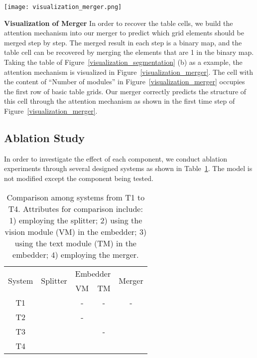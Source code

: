 \documentclass[review]{elsarticle}
\begin{document}
\begin{figure*}[!htb]
	\centerline{\texttt{[image: visualization\_merger.png]}}
	\caption{The visualization of the attention mechanism in the merger on the table images of the SciTSR dataset. The blue lines are the prediction of table grid structure from the splitter. The green mask in the table image denotes which grid elements should be merged for each time step.}
	\label{visualization_merger}
\end{figure*}

\textbf{Visualization of Merger} In order to recover the table cells, we build the attention mechanism into our merger to predict which grid elements should be merged step by step. The merged result in each step is a binary map, and the table cell can be recovered by merging the elements that are 1 in the binary map. Taking the table of Figure~\ref{visualization_segmentation} (b) as a example, the attention mechanism is visualized in Figure~\ref{visualization_merger}. The cell with the content of “Number of modules” in Figure~\ref{visualization_merger} occupies the first row of basic table grids. Our merger correctly predicts the structure of this cell through the attention mechanism as shown in the first time step of Figure~\ref{visualization_merger}.

\subsection{Ablation Study}
In order to investigate the effect of each component, we conduct ablation experiments through several designed systems as shown in Table~\ref{ablation-systems}. The model is not modified except the component being tested.

\begin{table}[!htp]
	\centering
	\renewcommand\arraystretch{1.1}
	\setlength{\tabcolsep}{4mm}
	
	\caption{Comparison among systems from T1 to T4. Attributes for comparison include: 1) employing the splitter; 2) using the vision module (VM) in the  embedder; 3) using the text module (TM) in the embedder; 4) employing the merger.}
	\label{ablation-systems}
	\begin{tabular}{ccccc}
		\hline
		\multirow{2}{*}{System} & \multirow{2}{*}{Splitter} & \multicolumn{2}{c}{Embedder} & \multirow{2}{*}{Merger} \\
		&            & VM            & TM           &                         \\ \hline
		T1           & \checkmark          & -             & -            & -                \\
		T2           & \checkmark          & -             & \checkmark   & \checkmark       \\
		T3           & \checkmark          & \checkmark    & -            & \checkmark       \\
		T4           & \checkmark          & \checkmark    & \checkmark   & \checkmark       \\ \hline
	\end{tabular}
\end{table}
\end{document}

